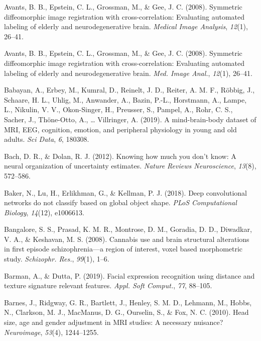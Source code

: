 \documentclass[11pt,american,a4paper,oneside,]{memoir} %
\begin{document}
\leavevmode\hypertarget{ref-avants2008symmetric}{}%
Avants, B. B., Epstein, C. L., Grossman, M., \& Gee, J. C. (2008). Symmetric diffeomorphic image registration with cross-correlation: Evaluating automated labeling of elderly and neurodegenerative brain. \emph{Medical Image Analysis}, \emph{12}(1), 26--41.

\leavevmode\hypertarget{ref-Avants2008-bv}{}%
Avants, B. B., Epstein, C. L., Grossman, M., \& Gee, J. C. (2008). Symmetric diffeomorphic image registration with cross-correlation: Evaluating automated labeling of elderly and neurodegenerative brain. \emph{Med. Image Anal.}, \emph{12}(1), 26--41.

\leavevmode\hypertarget{ref-Babayan2019-mo}{}%
Babayan, A., Erbey, M., Kumral, D., Reinelt, J. D., Reiter, A. M. F., Röbbig, J., Schaare, H. L., Uhlig, M., Anwander, A., Bazin, P.-L., Horstmann, A., Lampe, L., Nikulin, V. V., Okon-Singer, H., Preusser, S., Pampel, A., Rohr, C. S., Sacher, J., Thöne-Otto, A., \ldots{} Villringer, A. (2019). A mind-brain-body dataset of MRI, EEG, cognition, emotion, and peripheral physiology in young and old adults. \emph{Sci Data}, \emph{6}, 180308.

\leavevmode\hypertarget{ref-bach2012knowing}{}%
Bach, D. R., \& Dolan, R. J. (2012). Knowing how much you don't know: A neural organization of uncertainty estimates. \emph{Nature Reviews Neuroscience}, \emph{13}(8), 572--586.

\leavevmode\hypertarget{ref-baker2018deep}{}%
Baker, N., Lu, H., Erlikhman, G., \& Kellman, P. J. (2018). Deep convolutional networks do not classify based on global object shape. \emph{PLoS Computational Biology}, \emph{14}(12), e1006613.

\leavevmode\hypertarget{ref-Bangalore2008-kc}{}%
Bangalore, S. S., Prasad, K. M. R., Montrose, D. M., Goradia, D. D., Diwadkar, V. A., \& Keshavan, M. S. (2008). Cannabis use and brain structural alterations in first episode schizophrenia---a region of interest, voxel based morphometric study. \emph{Schizophr. Res.}, \emph{99}(1), 1--6.

\leavevmode\hypertarget{ref-Barman2019-af}{}%
Barman, A., \& Dutta, P. (2019). Facial expression recognition using distance and texture signature relevant features. \emph{Appl. Soft Comput.}, \emph{77}, 88--105.

\leavevmode\hypertarget{ref-Barnes2010-pu}{}%
Barnes, J., Ridgway, G. R., Bartlett, J., Henley, S. M. D., Lehmann, M., Hobbs, N., Clarkson, M. J., MacManus, D. G., Ourselin, S., \& Fox, N. C. (2010). Head size, age and gender adjustment in MRI studies: A necessary nuisance? \emph{Neuroimage}, \emph{53}(4), 1244--1255.
\end{document}
